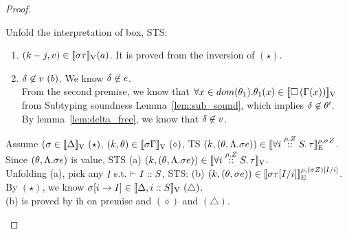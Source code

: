 \documentclass[a4paper,11pt]{article}
\theoremstyle{definition}
\begin{document}
\begin{proof}
\begin{mainitem}
%
Unfold the interpretation of box, STS:
\begin{enumerate}
\item  $(\stepiA - j, \valr ) \in \lrv{\ienv \type } (a) $.   It is proved from the inversion of $(\star)$.\\
\item $ \delta \not\in
 \valr~(b)$.  We know $\delta \not\in \expr$. \\
  From the second premise, we know that $\forall x \in
  dom(\env_1). \env_1(x) \in \lrv{\tbox{\Gamma(x)}}$ from Subtyping
  soundness Lemma~\ref{lem:sub_sound}, which implies $\delta \not\in
  \env' $.\\
  By lemma~\ref{lem:delta_free}, we know that $\delta \not\in \valr$.\\
\end{enumerate}  

Assume $(\ienv \in \lrv{\Delta}~(\star)$, $(\stepiA, \env) \in \lrv{\ienv \Gamma } ~ (\diamond)$, TS $(\stepiA, (\env, \eilam \ienv \expr)) \in \lre{\dmap}{\ienv \nnatA}{\tforall{\dmap}{\nnatA}{i} \type} $.\\
%
Since $(\env, \eilam \ienv \expr)$ is value, STS (a) $(\stepiA, (\env, \eilam \ienv \expr)) \in \lrv{\tforall{\dmap}{\nnatA}{i} \type}$.\\
%
Unfolding (a), pick any $I$ s.t. $\tvdash{} I :: S$, STS: (b) $(\stepiA, (\env, \ienv \expr)) \in \lre{\dmap}{(\ienv \nnatA)[I/i]}{\ienv \type [I/i]}$.\\
%
By $(\star)$, we know $\ienv[i \to I] \in \lrv{\Delta, i::S} ~ (\triangle)$.\\
%
(b) is proved by ih on premise and $(\diamond)$ and $(\triangle)$.\\




\end{mainitem}
\end{proof}
\end{document}
